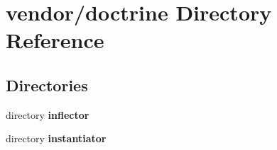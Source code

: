 \section{vendor/doctrine Directory Reference}
\label{dir_ec8d2306bded9e6afc4a1f1041ad6254}
\subsection*{Directories}
\begin{DoxyCompactItemize}
\item 
directory {\bf inflector}
\item 
directory {\bf instantiator}
\end{DoxyCompactItemize}
